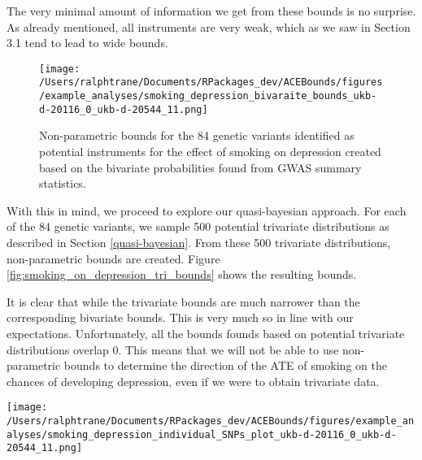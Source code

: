 \documentclass[
]{article}
\theoremstyle{plain}
\begin{document}
The very minimal amount of information we get from these bounds is no surprise. As already mentioned, all instruments are very weak, which as we saw in Section 3.1 tend to lead to wide bounds.

\begin{figure}[H]
  \texttt{[image: /Users/ralphtrane/Documents/RPackages\_dev/ACEBounds/figures/example\_analyses/smoking\_depression\_bivaraite\_bounds\_ukb-d-20116\_0\_ukb-d-20544\_11.png]}
  \caption{Non-parametric bounds for the 84 genetic variants identified as potential instruments for the effect of smoking on depression created based on the bivariate probabilities found from GWAS summary statistics.}
  \label{fig:smoking_on_depression_ind_bounds}
\end{figure}

With this in mind, we proceed to explore our quasi-bayesian approach. For each of the 84 genetic variants, we sample 500 potential trivariate distributions as described in Section \ref{quasi-bayesian}. From these 500 trivariate distributions, non-parametric bounds are created. Figure \ref{fig:smoking_on_depression_tri_bounds} shows the resulting bounds.

It is clear that while the trivariate bounds are much narrower than the corresponding bivariate bounds. This is very much so in line with our expectations. Unfortunately, all the bounds founds based on potential trivariate distributions overlap 0. This means that we will not be able to use non-parametric bounds to determine the direction of the ATE of smoking on the chances of developing depression, even if we were to obtain trivariate data.

\clearpage

\begin{sidewaysfigure}
  \texttt{[image: /Users/ralphtrane/Documents/RPackages\_dev/ACEBounds/figures/example\_analyses/smoking\_depression\_individual\_SNPs\_plot\_ukb-d-20116\_0\_ukb-d-20544\_11.png]}
    \caption{500 sets of bounds of the average treatment effect of smoking on depression for each of the 84 SNPs. Each bound is based on a set of values for the trivariate distribution randomly sampled. Bounds are color coded to show if they overlap 0 (grey) or do not (red). All bounds overlap 0.}
    \label{fig:smoking_on_depression_tri_bounds}
\end{sidewaysfigure}

\clearpage
\end{document}
